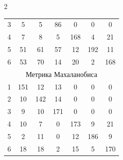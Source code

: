 \begin{multicols}{2}
\begin{center}
{\begin{tabular}{|c|c|c|c|c|c|c|}


3  & 5  & \hphantom{9}5  & 86 & \hphantom{9}0  & \hphantom{9}0  & \hphantom{9}0\\




4  & 7  & \hphantom{9}8  & \hphantom{9}5  & 168\hphantom{9}& \hphantom{9}4  & 21 \\




5  & 51\hphantom{9} & 61 & 57 & 12 & 192\hphantom{9}& 11 \\




6  & 53\hphantom{9} & 70 & 14 & 20 & \hphantom{9}2  & 168\hphantom{9}\\


\hline


\multicolumn{7}{|c|}{Метрика Махаланобиса}\\


\hline


1& 151\hphantom{9} & 12 & 13    & \hphantom{9}0     & \hphantom{9}0    & \hphantom{9}0 \\ 




  2  & 10  & 142\hphantom{9}& 14    & \hphantom{9}0     & \hphantom{9}0    & \hphantom{9}0 \\ 




  3  & \hphantom{9}9   & 10 & 171\hphantom{9}   & \hphantom{9}0     & \hphantom{9}0    & \hphantom{9}0 \\




   4  & 10  & \hphantom{9}7  & \hphantom{9}0     & 173\hphantom{9}   & \hphantom{9}9    & 21\\  




     5  & \hphantom{9}2   & 11 & \hphantom{9}0     & 12    & 186\hphantom{9}  & \hphantom{9}9 \\ 




       6  & 18  & 18 & \hphantom{9}2     & 15    & \hphantom{9}5    & 170\hphantom{9}\\ 


\hline


\end{tabular}}


\end{center} 






\end{multicols}
